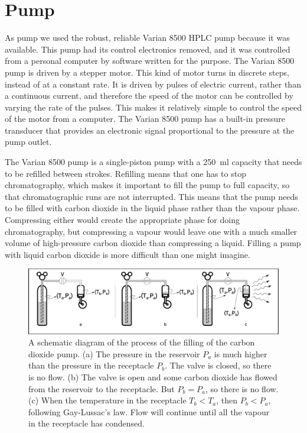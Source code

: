 \section{Pump}
\label{sec:CO2Pump}

As pump we used the robust, reliable Varian 8500 HPLC pump because it was
available. This pump had its control electronics removed, and it was controlled
from a personal computer by software written for the purpose. The Varian 8500
pump is driven by a stepper motor. This kind of motor turns in discrete steps,
instead of at a constant rate. It is driven by pulses of electric current,
rather than a continuous current, and therefore the speed of the motor can be
controlled by varying the rate of the pulses. This makes it relatively simple to
control the speed of the motor from a computer. The Varian 8500 pump has a
built-in pressure transducer that provides an electronic signal proportional to
the pressure at the pump outlet.

The Varian 8500 pump is a single-piston pump with a \SI{250}{\milli\litre}
capacity that needs to be refilled between strokes. Refilling means that one has
to stop chromatography, which makes it important to fill the pump to full
capacity, so that chromatographic runs are not interrupted. This means that the
pump needs to be filled with carbon dioxide in the liquid phase rather than the
vapour phase. Compressing either would create the appropriate phase for doing
chromatography, but compressing a vapour would leave one with a much smaller
volume of high-pressure carbon dioxide than compressing a liquid. Filling a pump
with liquid carbon dioxide is more difficult than one might imagine.

\begin{figure}
\centering
\includegraphics[width=\textwidth]{Figures/CO2Filling.pdf}
\decoRule

\caption[Fillng a CO\textsubscript{2} pump.]{A schematic diagram of the process of the filling of
the carbon dioxide pump. (a) The pressure in the reservoir $P_a$ is much higher
than the pressure in the receptacle $P_b$. The valve is closed, so there is no
flow. (b) The valve is open and some carbon dioxide has flowed from the
reservoir to the receptacle. But $P_b = P_a$, so there is no flow. (c) When the
temperature in the receptacle $T_b < T_a$, then $P_b  < P_a$, following
Gay-Lussac's law. Flow will continue until all the vapour in the receptacle has
condensed.}

\label{fig:co2fill}
\end{figure}


